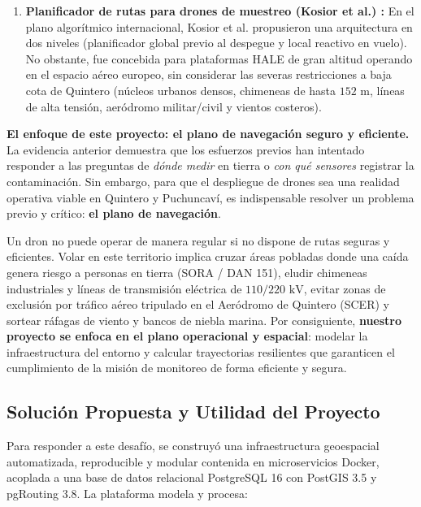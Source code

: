 \documentclass[letterpaper,12pt]{article}
\begin{document}
\begin{enumerate}
    \item \textbf{Planificador de rutas para drones de muestreo (Kosior et al.) \cite{kosior}:} En el plano algorítmico internacional, Kosior et al. propusieron una arquitectura en dos niveles (planificador global previo al despegue y local reactivo en vuelo). No obstante, fue concebida para plataformas HALE de gran altitud operando en el espacio aéreo europeo, sin considerar las severas restricciones a baja cota de Quintero (núcleos urbanos densos, chimeneas de hasta $152\text{ m}$, líneas de alta tensión, aeródromo militar/civil y vientos costeros).
\end{enumerate}

\noindent \textbf{El enfoque de este proyecto: el plano de navegación seguro y eficiente.}
La evidencia anterior demuestra que los esfuerzos previos han intentado responder a las preguntas de \textit{dónde medir} en tierra o \textit{con qué sensores} registrar la contaminación. Sin embargo, para que el despliegue de drones sea una realidad operativa viable en Quintero y Puchuncaví, es indispensable resolver un problema previo y crítico: \textbf{el plano de navegación}. 

Un dron no puede operar de manera regular si no dispone de rutas seguras y eficientes. Volar en este territorio implica cruzar áreas pobladas donde una caída genera riesgo a personas en tierra (SORA / DAN 151), eludir chimeneas industriales y líneas de transmisión eléctrica de $110/220\text{ kV}$, evitar zonas de exclusión por tráfico aéreo tripulado en el Aeródromo de Quintero (SCER) y sortear ráfagas de viento y bancos de niebla marina. Por consiguiente, \textbf{nuestro proyecto se enfoca en el plano operacional y espacial}: modelar la infraestructura del entorno y calcular trayectorias resilientes que garanticen el cumplimiento de la misión de monitoreo de forma eficiente y segura.

\subsection{Solución Propuesta y Utilidad del Proyecto}
\label{subsec:solucion}

Para responder a este desafío, se construyó una infraestructura geoespacial automatizada, reproducible y modular contenida en microservicios Docker, acoplada a una base de datos relacional PostgreSQL 16 con PostGIS 3.5 y pgRouting 3.8. La plataforma modela y procesa:
\end{document}
